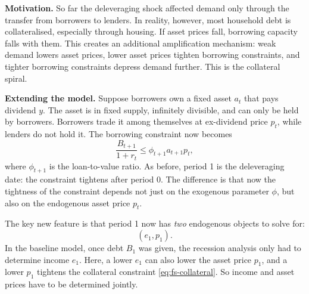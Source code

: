 \documentclass[11pt,a4paper]{article}
\begin{document}
\textbf{Motivation.} So far the deleveraging shock affected demand only through the transfer from borrowers to lenders. In reality, however, most household debt is collateralised, especially through housing. If asset prices fall, borrowing capacity falls with them. This creates an additional amplification mechanism: weak demand lowers asset prices, lower asset prices tighten borrowing constraints, and tighter borrowing constraints depress demand further. This is the collateral spiral.

\textbf{Extending the model.} Suppose borrowers own a fixed asset $a_t$ that pays dividend $y$. The asset is in fixed supply, infinitely divisible, and can only be held by borrowers. Borrowers trade it among themselves at ex-dividend price $p_t$, while lenders do not hold it. The borrowing constraint now becomes
\begin{equation}\label{eq:fs-collateral}
\frac{B_{t+1}}{1+r_t} \leq \phi_{t+1} a_{t+1} p_t,
\end{equation}
where $\phi_{t+1}$ is the loan-to-value ratio. As before, period 1 is the deleveraging date: the constraint tightens after period 0. The difference is that now the tightness of the constraint depends not just on the exogenous parameter $\phi$, but also on the endogenous asset price $p_t$.

The key new feature is that period 1 now has \emph{two} endogenous objects to solve for:
\begin{equation}\label{eq:fs-unknowns}
(e_1,p_1).
\end{equation}
In the baseline model, once debt $B_1$ was given, the recession analysis only had to determine income $e_1$. Here, a lower $e_1$ can also lower the asset price $p_1$, and a lower $p_1$ tightens the collateral constraint \eqref{eq:fs-collateral}. So income and asset prices have to be determined jointly.
\end{document}
